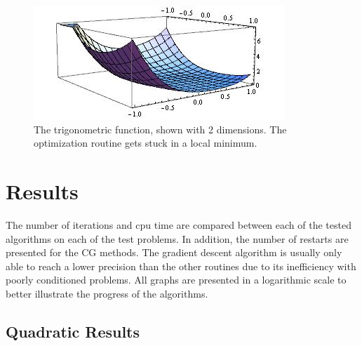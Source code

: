\documentclass[12pt]{amsart}
\begin{document}
\begin{figure}[thpb]
\centering
\includegraphics[scale=0.60]{images/3dtrig.jpg}
\caption{The trigonometric function, shown with 2 dimensions.  The optimization routine gets stuck in a local minimum.}
\label{fig:3d-trig}
\end{figure}

\section{Results}
The number of iterations and cpu time are compared between each of the tested algorithms on each of the test problems.  In addition, the number of restarts are presented for the CG methods.  The gradient descent algorithm is usually only able to reach a lower precision than the other routines due to its inefficiency with poorly conditioned problems. All graphs are presented in a logarithmic scale to better illustrate the progress of the algorithms.

\subsection{Quadratic Results}
\end{document}
